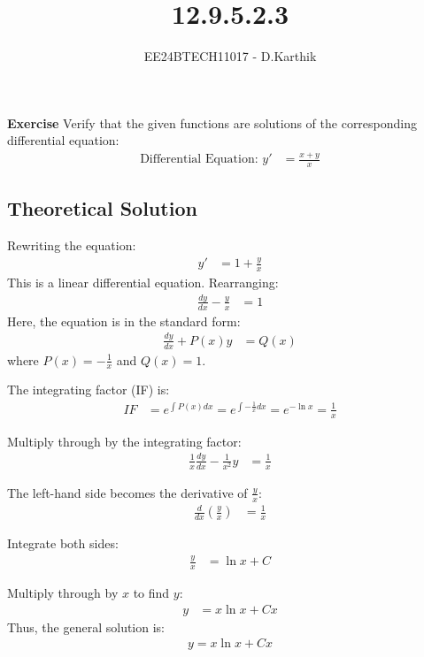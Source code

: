 \documentclass[journal]{IEEEtran}
\begin{document}

\vspace{3cm}
\title{12.9.5.2.3}
\author{EE24BTECH11017 - D.Karthik}
{\let\newpage\relax\maketitle}
\renewcommand{\thefigure}{\theenumi}
\renewcommand{\thetable}{\theenumi}

\textbf{Exercise} Verify that the given functions are solutions of the corresponding differential equation:
\begin{align}
    \text{Differential Equation: } y' &= \frac{x + y}{x}
\end{align}

\subsection*{Theoretical Solution}

Rewriting the equation:
\begin{align}
    y' &= 1 + \frac{y}{x}
\end{align}
This is a linear differential equation. Rearranging:
\begin{align}
    \frac{dy}{dx} - \frac{y}{x} &= 1
\end{align}
Here, the equation is in the standard form:
\begin{align}
    \frac{dy}{dx} + P(x)y &= Q(x)
\end{align}
where \( P(x) = -\frac{1}{x} \) and \( Q(x) = 1 \).

The integrating factor (IF) is:
\begin{align}
    IF &= e^{\int P(x) dx} = e^{\int -\frac{1}{x} dx} = e^{-\ln x} = \frac{1}{x}
\end{align}

Multiply through by the integrating factor:
\begin{align}
    \frac{1}{x}\frac{dy}{dx} - \frac{1}{x^2}y &= \frac{1}{x}
\end{align}

The left-hand side becomes the derivative of \( \frac{y}{x} \):
\begin{align}
    \frac{d}{dx}\left(\frac{y}{x}\right) &= \frac{1}{x}
\end{align}

Integrate both sides:
\begin{align}
    \frac{y}{x} &= \ln x + C
\end{align}

Multiply through by \( x \) to find \( y \):
\begin{align}
    y &= x\ln x + Cx
\end{align}
Thus, the general solution is:
\begin{align}
    y = x\ln x + Cx
\end{align}
\end{document}
